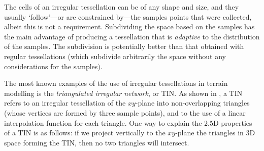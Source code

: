 The cells of an irregular tessellation can be of any shape and size, and they usually `follow'---or are constrained by---the samples points that were collected, albeit this is not a requirement. 
Subdividing the space based on the samples has the main advantage of producing a tessellation that is \emph{adaptive} to the distribution of the samples. 
The subdivision is potentially better than that obtained with regular tessellations (which subdivide arbitrarily the space without any considerations for the samples).

%

The most known examples of the use of irregular tessellations in terrain modelling is the \emph{triangulated irregular network}, or TIN\@.
As shown in ,
a TIN refers to an irregular tessellation of the $xy$-plane into non-overlapping triangles (whose vertices are formed by three sample points), and to the use of a linear interpolation function for each triangle. 
One way to explain the 2.5D properties of a TIN is as follows: if we project vertically to the $xy$-plane the triangles in 3D space forming the TIN, then no two triangles will intersect.

